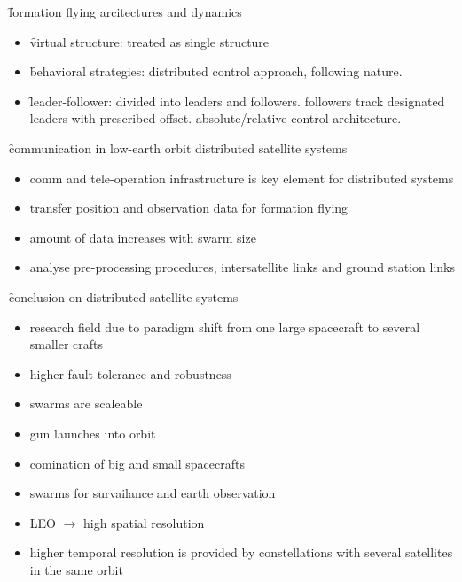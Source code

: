 \f{formation flying arcitectures and dynamics}
\begin{itemize}
 \item \f{virtual structure}: treated as single structure
 \item \f{behavioral strategies}: distributed control approach, following nature.
 \item \f{leader-follower}: divided into leaders and followers. followers track designated leaders with prescribed offset. absolute/relative control architecture.
\end{itemize}

\f{communication in low-earth orbit distributed satellite systems}
\begin{itemize}
 \item comm and tele-operation infrastructure is key element for distributed systems
 \item transfer position and observation data for formation flying
 \item amount of data increases with swarm size
 \item analyse pre-processing procedures, intersatellite links and ground station links
\end{itemize}

\f{conclusion on distributed satellite systems}
\begin{itemize}
 \item research field due to paradigm shift from one large spacecraft to several smaller crafts
 \item higher fault tolerance and robustness
 \item swarms are scaleable
 \item gun launches into orbit
 \item comination of big and small spacecrafts
 \item swarms for survailance and earth observation
 \item LEO $\rightarrow$ high spatial resolution
 \item higher temporal resolution is provided by constellations with several satellites in the same orbit
\end{itemize}
